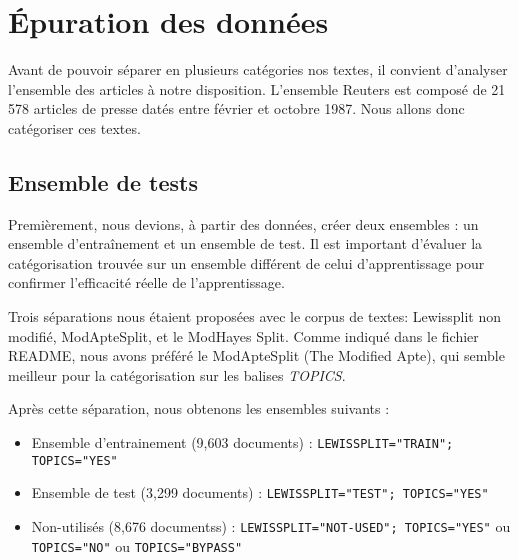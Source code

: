 \section{Épuration des données}
Avant de pouvoir séparer en plusieurs catégories nos textes, il convient d'analyser l'ensemble des articles à notre disposition. L'ensemble Reuters est composé de 21 578 articles de presse datés entre février et octobre 1987. Nous allons donc catégoriser ces textes.
\subsection{Ensemble de tests}
Premièrement, nous devions, à partir des données, créer deux ensembles : un ensemble d'entraînement et un ensemble de test. Il est important d'évaluer la catégorisation trouvée sur un ensemble différent de celui d'apprentissage pour confirmer l'efficacité réelle de l'apprentissage.

Trois séparations nous étaient proposées avec le corpus de textes: Lewissplit non modifié, ModApteSplit, et le ModHayes Split.
Comme indiqué dans le fichier \textsc{README}, nous avons préféré le ModApteSplit (The Modified Apte), qui semble meilleur pour la catégorisation sur les balises \textit{TOPICS}.

Après cette séparation, nous obtenons les ensembles suivants : 
\begin{itemize}
\item Ensemble d'entrainement (9,603 documents) : \texttt{LEWISSPLIT="TRAIN";
 TOPICS="YES"}
\item Ensemble de test (3,299 documents) : \texttt{LEWISSPLIT="TEST";
TOPICS="YES"}
\item Non-utilisés (8,676 documentss) : \texttt{LEWISSPLIT="NOT-USED";
TOPICS="YES"} ou \texttt{TOPICS="NO"}  ou \texttt{TOPICS="BYPASS"}
\end{itemize}
